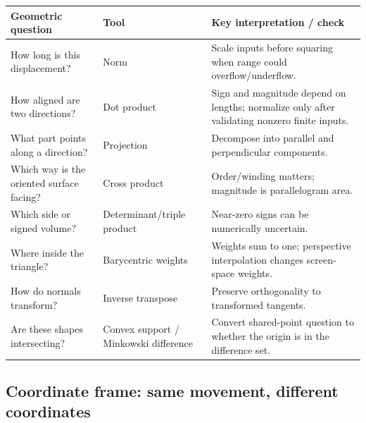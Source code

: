 {\def\LTcaptype{none} %
\begin{longtable}[]{@{}
  >{\raggedright\arraybackslash}p{}
  >{\raggedright\arraybackslash}p{}
  >{\raggedright\arraybackslash}p{}@{}}
\toprule\noalign{}
\begin{minipage}[b]{\linewidth}\raggedright
Geometric question
\end{minipage} & \begin{minipage}[b]{\linewidth}\raggedright
Tool
\end{minipage} & \begin{minipage}[b]{\linewidth}\raggedright
Key interpretation / check
\end{minipage} \\
\midrule\noalign{}
\endhead
\bottomrule\noalign{}
\endlastfoot
How long is this displacement? & Norm & Scale inputs before squaring when range could overflow/underflow. \\
How aligned are two directions? & Dot product & Sign and magnitude depend on lengths; normalize only after validating nonzero finite inputs. \\
What part points along a direction? & Projection & Decompose into parallel and perpendicular components. \\
Which way is the oriented surface facing? & Cross product & Order/winding matters; magnitude is parallelogram area. \\
Which side or signed volume? & Determinant/triple product & Near-zero signs can be numerically uncertain. \\
Where inside the triangle? & Barycentric weights & Weights sum to one; perspective interpolation changes screen-space weights. \\
How do normals transform? & Inverse transpose & Preserve orthogonality to transformed tangents. \\
Are these shapes intersecting? & Convex support / Minkowski difference & Convert shared-point question to whether the origin is in the difference set. \\
\end{longtable}
}

\subsection{Coordinate frame: same movement, different coordinates}\label{appendix-38d9c8aca357-coordinate-frame-same-movement-different-coordinates}


